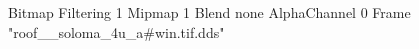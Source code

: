{Bitmap
	{Filtering 1}
	{Mipmap 1}
	{Blend none}
	{AlphaChannel 0}
	{Frame "roof__soloma_4u_a#win.tif.dds"}
}
